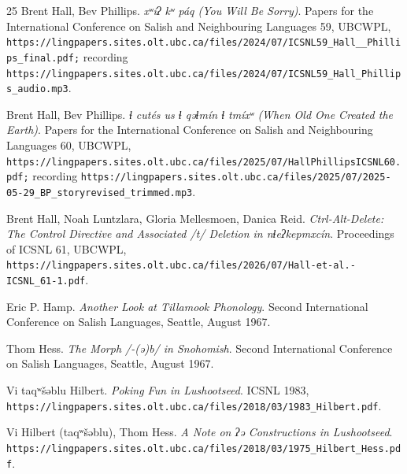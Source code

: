 \begin{thebibliography}{25}
Brent Hall, Bev Phillips. \emph{xʷíʔ kʷ páq (You Will Be Sorry)}. Papers for the International Conference on Salish and Neighbouring Languages 59, UBCWPL, \texttt{https:/\allowbreak{}/\allowbreak{}lingpapers.sites.olt.ubc.ca/\allowbreak{}files/\allowbreak{}2024/\allowbreak{}07/\allowbreak{}ICSNL59\_\allowbreak{}Hall\_\allowbreak{}\_\allowbreak{}Phillips\_\allowbreak{}final.pdf;} recording \texttt{https:/\allowbreak{}/\allowbreak{}lingpapers.sites.olt.ubc.ca/\allowbreak{}files/\allowbreak{}2024/\allowbreak{}07/\allowbreak{}ICSNL59\_\allowbreak{}Hall\_\allowbreak{}Phillips\_\allowbreak{}audio.mp3}.

Brent Hall, Bev Phillips. \emph{ɬ cutés us ɬ qəɬmín ɬ tmíxʷ (When Old One Created the Earth)}. Papers for the International Conference on Salish and Neighbouring Languages 60, UBCWPL, \texttt{https:/\allowbreak{}/\allowbreak{}lingpapers.sites.olt.ubc.ca/\allowbreak{}files/\allowbreak{}2025/\allowbreak{}07/\allowbreak{}HallPhillipsICSNL60.pdf;} recording \texttt{https:/\allowbreak{}/\allowbreak{}lingpapers.sites.olt.ubc.ca/\allowbreak{}files/\allowbreak{}2025/\allowbreak{}07/\allowbreak{}2025-05-29\_\allowbreak{}BP\_\allowbreak{}storyrevised\_\allowbreak{}trimmed.mp3}.

Brent Hall, Noah Luntzlara, Gloria Mellesmoen, Danica Reid. \emph{Ctrl-Alt-Delete: The Control Directive and Associated /t/ Deletion in nɬeʔkepmxcín}. Proceedings of ICSNL 61, UBCWPL, \texttt{https:/\allowbreak{}/\allowbreak{}lingpapers.sites.olt.ubc.ca/\allowbreak{}files/\allowbreak{}2026/\allowbreak{}07/\allowbreak{}Hall-et-al.-ICSNL\_\allowbreak{}61-1.pdf}.

Eric P. Hamp. \emph{Another Look at Tillamook Phonology}. Second International Conference on Salish Languages, Seattle, August 1967.

Thom Hess. \emph{The Morph /-(ə)b/ in Snohomish}. Second International Conference on Salish Languages, Seattle, August 1967.

Vi taqʷšəblu Hilbert. \emph{Poking Fun in Lushootseed}. ICSNL 1983, \texttt{https:/\allowbreak{}/\allowbreak{}lingpapers.sites.olt.ubc.ca/\allowbreak{}files/\allowbreak{}2018/\allowbreak{}03/\allowbreak{}1983\_\allowbreak{}Hilbert.pdf}.

Vi Hilbert (taqʷšəblu), Thom Hess. \emph{A Note on ʔə Constructions in Lushootseed}. \texttt{https:/\allowbreak{}/\allowbreak{}lingpapers.sites.olt.ubc.ca/\allowbreak{}files/\allowbreak{}2018/\allowbreak{}03/\allowbreak{}1975\_\allowbreak{}Hilbert\_\allowbreak{}Hess.pdf}.


\end{thebibliography}
